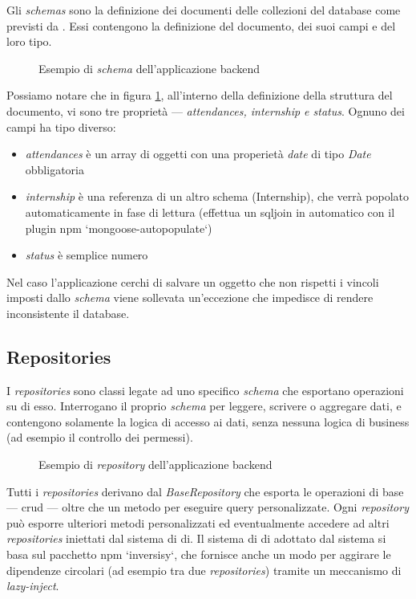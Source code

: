 Gli \textit{schemas} sono la definizione dei documenti delle collezioni del database come previsti da \mongoosejs. Essi contengono la definizione del documento, dei suoi campi e del loro tipo.
\begin{figure}[!h] 
	\centering    
	
	\caption[Esempio di \textit{schema} dell'applicazione \gls{backend}]{Esempio di \textit{schema} dell'applicazione \gls{backend}}
	\label{fig:server-schema}
\end{figure}
Possiamo notare che in figura \ref{fig:server-schema}, all'interno della definizione della struttura del documento, vi sono tre proprietà --- \textit{attendances, internship e status}. Ognuno dei campi ha tipo diverso:
\begin{itemize}
	\item \textit{attendances} è un array di oggetti con una properietà \textit{date} di tipo \textit{Date} obbligatoria
	\item \textit{internship} è una referenza di un altro schema (Internship), che verrà popolato automaticamente in fase di lettura (effettua un \gls{sqljoin} in automatico con il plugin \acrshort{npm} `mongoose-autopopulate`)
	\item \textit{status} è semplice numero
\end{itemize}
Nel caso l'applicazione cerchi di salvare un oggetto che non rispetti i vincoli imposti dallo \textit{schema} viene sollevata un'eccezione che impedisce di rendere inconsistente il database.

\subsection{Repositories}
I \textit{repositories} sono classi legate ad uno specifico \textit{schema} che esportano operazioni su di esso. Interrogano il proprio \textit{schema} per leggere, scrivere o aggregare dati, e contengono solamente la logica di accesso ai dati, senza nessuna logica di business (ad esempio il controllo dei permessi).
\begin{figure}[!h] 
	\centering    
	
	\caption[Esempio di \textit{Repository}]{Esempio di \textit{repository} dell'applicazione \gls{backend}}
	\label{fig:server-repository}
\end{figure}
Tutti i \textit{repositories} derivano dal \textit{BaseRepository} che esporta le operazioni di base --- \gls{crud} --- oltre che un metodo per eseguire query personalizzate.
Ogni \textit{repository} può esporre ulteriori metodi personalizzati ed eventualmente accedere ad altri \textit{repositories} iniettati dal sistema di \acrfull{di}. Il sistema di \acrshort{di} adottato dal sistema si basa sul pacchetto \acrshort{npm} `inversisy`, che fornisce anche un modo per aggirare le dipendenze circolari (ad esempio tra due \textit{repositories}) tramite un meccanismo di \textit{lazy-inject}.

